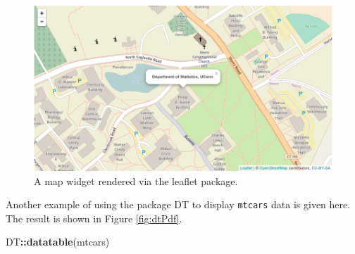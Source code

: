 \documentclass[11pt,letterpaper,]{article}
\newenvironment{Shaded}{\begin{snugshade}}{\end{snugshade}}
\newcommand{\DataTypeTok}[1]{\textcolor[rgb]{0.13,0.29,0.53}{#1}}
\newcommand{\DecValTok}[1]{\textcolor[rgb]{0.00,0.00,0.81}{#1}}
\newcommand{\FloatTok}[1]{\textcolor[rgb]{0.00,0.00,0.81}{#1}}
\newcommand{\KeywordTok}[1]{\textcolor[rgb]{0.13,0.29,0.53}{\textbf{#1}}}
\newcommand{\NormalTok}[1]{#1}
\newcommand{\OperatorTok}[1]{\textcolor[rgb]{0.81,0.36,0.00}{\textbf{#1}}}
\newcommand{\StringTok}[1]{\textcolor[rgb]{0.31,0.60,0.02}{#1}}
\newcommand{\pkg}[1]{{\normalfont\fontseries{b}\selectfont #1}}
\theoremstyle{definition}
\theoremstyle{definition}
\theoremstyle{definition}
\theoremstyle{remark}
\begin{document}
\begin{Shaded}
\end{Shaded}

\begin{figure}

{\centering \includegraphics[width=0.9\linewidth]{figs/webshot_mapUConn} 

}

\caption{A map widget rendered via the \pkg{leaflet} package.}\label{fig:mapPdf}
\end{figure}

Another example of using the package \pkg{DT} to display \texttt{mtcars}
data is given here. The result is shown in Figure \ref{fig:dtPdf}.



\begin{Shaded}
\begin{Highlighting}[]
\NormalTok{DT}\OperatorTok{::}\KeywordTok{datatable}\NormalTok{(mtcars)}
\end{Highlighting}
\end{Shaded}
\end{document}
